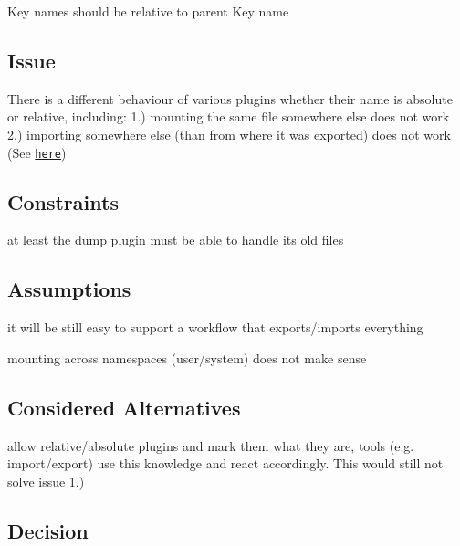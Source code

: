 Key names should be relative to parent Key name

\subsection*{Issue}

There is a different behaviour of various plugins whether their name is absolute or relative, including\+: 1.) mounting the same file somewhere else does not work 2.) importing somewhere else (than from where it was exported) does not work (See \href{https://github.com/ElektraInitiative/libelektra/issues/51}{\tt here})

\subsection*{Constraints}


\begin{DoxyItemize}
\item at least the dump plugin must be able to handle its old files
\end{DoxyItemize}

\subsection*{Assumptions}


\begin{DoxyItemize}
\item it will be still easy to support a workflow that exports/imports everything
\item mounting across namespaces (user/system) does not make sense
\end{DoxyItemize}

\subsection*{Considered Alternatives}


\begin{DoxyItemize}
\item allow relative/absolute plugins and mark them what they are, tools (e.\+g. import/export) use this knowledge and react accordingly. This would still not solve issue 1.)
\end{DoxyItemize}

\subsection*{Decision}

